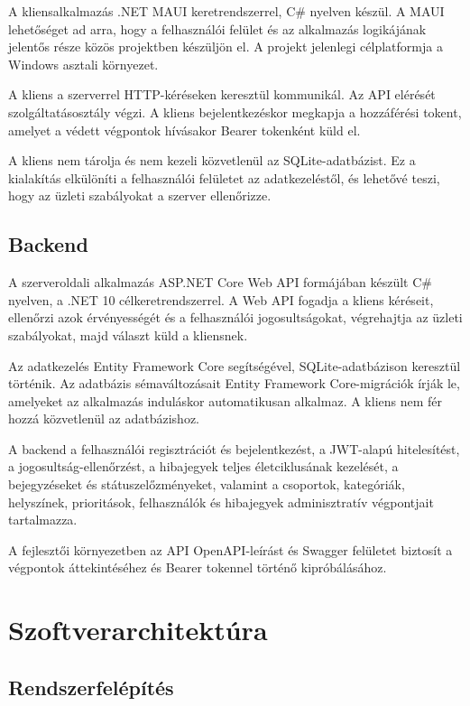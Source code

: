 \documentclass[12pt, a4paper, twoside]{article}
\begin{document}
A kliensalkalmazás .NET MAUI keretrendszerrel, C\# nyelven készül. A MAUI lehetőséget ad arra, hogy a felhasználói felület és az alkalmazás logikájának jelentős része közös projektben készüljön el. A projekt jelenlegi célplatformja a Windows asztali környezet.

A kliens a szerverrel HTTP-kéréseken keresztül kommunikál. Az API elérését szolgáltatásosztály végzi. A kliens bejelentkezéskor megkapja a hozzáférési tokent, amelyet a védett végpontok hívásakor Bearer tokenként küld el.

A kliens nem tárolja és nem kezeli közvetlenül az SQLite-adatbázist. Ez a kialakítás elkülöníti a felhasználói felületet az adatkezeléstől, és lehetővé teszi, hogy az üzleti szabályokat a szerver ellenőrizze.

\subsection{Backend}

A szerveroldali alkalmazás ASP.NET Core Web API formájában készült C\# nyelven, a .NET 10 célkeretrendszerrel. A Web API fogadja a kliens kéréseit, ellenőrzi azok érvényességét és a felhasználói jogosultságokat, végrehajtja az üzleti szabályokat, majd választ küld a kliensnek.

Az adatkezelés Entity Framework Core segítségével, SQLite-adatbázison keresztül történik. Az adatbázis sémaváltozásait Entity Framework Core-migrációk írják le, amelyeket az alkalmazás induláskor automatikusan alkalmaz. A kliens nem fér hozzá közvetlenül az adatbázishoz.

A backend a felhasználói regisztrációt és bejelentkezést, a JWT-alapú hitelesítést, a jogosultság-ellenőrzést, a hibajegyek teljes életciklusának kezelését, a bejegyzéseket és státuszelőzményeket, valamint a csoportok, kategóriák, helyszínek, prioritások, felhasználók és hibajegyek adminisztratív végpontjait tartalmazza.

A fejlesztői környezetben az API OpenAPI-leírást és Swagger felületet biztosít a végpontok áttekintéséhez és Bearer tokennel történő kipróbálásához.

\section{Szoftverarchitektúra}

\subsection{Rendszerfelépítés}
\end{document}
